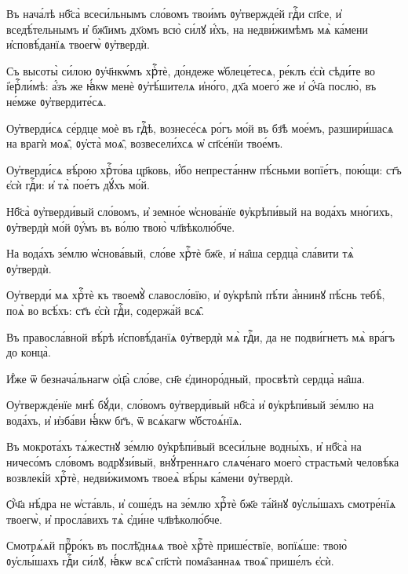 \hKv Въ нача́лѣ нб҃са̀ всеси́льнымъ сло́вомъ твои́мъ  ᲂу҆твержде́й гдⷭ҇и сп҃се, и҆ вседѣ́тельнымъ и҆ бж҃їимъ  дх҃омъ всю̀ си́лꙋ и҆́хъ, на   недви́жимѣмъ мѧ̀ ка́мени и҆сповѣ́данїѧ твоегѡ̀  ᲂу҆твердѝ. 
%

\hKv Съ высоты̀ си́лою ᲂу҆ч҃нкѡ́мъ хрⷭ҇тѐ,  до́ндеже ѡ҆блеце́тесѧ, ре́клъ є҆сѝ сѣди́те во  і҆ерⷭ҇ли́мѣ: а҆́зъ же ꙗ҆́кѡ менѐ ᲂу҆тѣ́шителѧ и҆но́го,  дх҃а моего́ же и҆ ѻ҆́ч҃а послю̀, въ не́мже ᲂу҆твердите́сѧ. 
%

\hKv Оу҆тверди́сѧ се́рдце моѐ въ гдⷭ҇ѣ, вознесе́сѧ ро́гъ мо́й  въ бз҃ѣ мое́мъ, разшири́шасѧ на врагѝ моѧ̑, ᲂу҆ста̀ моѧ̑,  возвесели́хсѧ ѡ҆ сп҃се́нїи твое́мъ. 

\hKv Оу҆тверди́сѧ вѣ́рою хрⷭ҇то́ва цр҃ковь, и҆́бо непреста́ннѡ  пѣ́сньми вопїе́тъ, пою́щи: ст҃ъ є҆сѝ гдⷭ҇и: и҆ тѧ̀ пое́тъ  дꙋ́хъ мо́й.  

\hKv Нб҃са̀ ᲂу҆тверди́вый сло́вомъ, и҆ земно́е ѡ҆снова́нїе  ᲂу҆крѣпи́вый на вода́хъ мно́гихъ, ᲂу҆твердѝ мо́й ᲂу҆́мъ  въ во́лю твою̀ чл҃вѣколю́бче. 

\hKv На вода́хъ зе́млю ѡ҆снова́вый, сло́ве хрⷭ҇тѐ бж҃е, и҆ на̑ша  сердца̀ сла́вити тѧ̀ ᲂу҆твердѝ.  

\hKv Оу҆тверди́ мѧ хрⷭ҇тѐ къ твоемꙋ̀ славосло́вїю, и҆  ᲂу҆крѣпѝ пѣ́ти а҆́ннинꙋ пѣ́снь тебѣ̀, поѧ̀ во всѣ́хъ:  ст҃ъ є҆сѝ гдⷭ҇и, содержа́й всѧ̑. 

\hKv Въ правосла́вной вѣ́рѣ и҆сповѣ́данїѧ ᲂу҆твердѝ мѧ̀  гдⷭ҇и, да не подви́гнетъ мѧ̀ вра́гъ до конца̀. 

\hKv И҆́же ѿ безнача́льнагѡ ѻ҆ц҃а̀ сло́ве, сн҃е  є҆диноро́дный, просвѣтѝ сердца̀ на̑ша. 

\hKv Оу҆твержде́нїе мнѣ̀ бꙋ́ди, сло́вомъ ᲂу҆тверди́вый нб҃са̀  и҆ ᲂу҆крѣпи́вый зе́млю на вода́хъ, и҆ и҆зба́ви ꙗ҆́кѡ  бг҃ъ, ѿ всѧ́кагѡ ѡ҆бстоѧ́нїѧ. 

\hKv Въ мокрота́хъ тѧ́жестнꙋ зе́млю ᲂу҆крѣпи́вый всеси́льне  водны́хъ, и҆ нб҃са̀ на ничесо́мъ сло́вомъ водрꙋзи́вый,  внꙋ́треннѧго слѧче́наго моего̀ страстьмѝ человѣ́ка  возвлекі́й хрⷭ҇тѐ, недви́жимомъ твоеѧ̀ вѣ́ры ка́мени  ᲂу҆твердѝ. 
%

\hKv Ѻ҆́ч҃а нѣ́дра не ѡ҆ста́вль, и҆ соше́дъ на зе́млю хрⷭ҇тѐ  бж҃е та́йнꙋ ᲂу҆слы́шахъ    смотре́нїѧ твоегѡ̀, и҆ просла́вихъ тѧ̀ є҆ди́не  чл҃вѣколю́бче. 
%

\hKv Смотрѧ́ѧй прⷪ҇ро́къ въ послѣ̑днѧѧ твоѐ  хрⷭ҇тѐ прише́ствїе, вопїѧ́ше: твою̀ ᲂу҆слы́шахъ гдⷭ҇и  си́лꙋ, ꙗ҆́кѡ всѧ̑ сп҃стѝ пома̑заннаѧ твоѧ̑ прише́лъ  є҆сѝ.  
%


